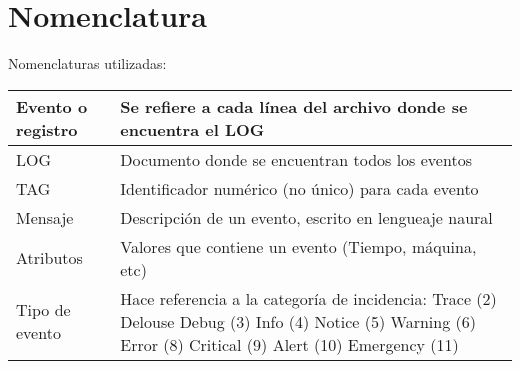 \section{Nomenclatura}
Nomenclaturas utilizadas:
\begin{center}
    \begin{tabular}{ | l |  p{10cm} |}
    \hline
    Evento o registro & Se refiere a cada línea del archivo donde se encuentra el LOG \\ \hline
    LOG &  Documento donde se encuentran todos los eventos \\ \hline
    TAG & Identificador numérico (no único) para cada evento\\ \hline
    Mensaje & Descripción de un evento, escrito en lengueaje naural\\ \hline
    Atributos & Valores que contiene un evento (Tiempo, máquina, etc)\\ \hline
    Tipo de evento & Hace referencia a la categoría de incidencia: Trace (2)
    Delouse
    Debug (3)
    Info (4)
    Notice (5)
    Warning (6)
    Error (8)
    Critical (9)
    Alert (10)
    Emergency (11) \\ \hline
    
    \end{tabular}
\end{center}